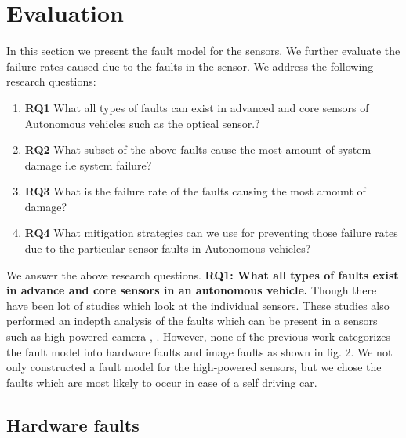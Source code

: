 \section{Evaluation}
In this section we present the fault model for the sensors. We further evaluate the failure rates caused due to the faults in the sensor. We address the following research questions:
\begin{enumerate}
	\item \textbf{RQ1}
	What all types of faults can exist in advanced and core sensors of Autonomous vehicles such as the optical sensor.?
	\item \textbf{RQ2}
	What subset of the above faults cause the most amount of system damage i.e system failure?
	\item \textbf{RQ3}
	What is the failure rate of the faults causing the most amount of damage?
	\item \textbf{RQ4}
	What mitigation strategies can we use for preventing those failure rates due to the particular sensor faults in Autonomous vehicles?
\end{enumerate}
\vskip 0.2in
We answer the above research questions. 
\vskip 0.2in
\textbf{RQ1: What all types of faults exist in advance and core sensors in an autonomous vehicle.}
Though there have been lot of studies which look at the individual sensors. These studies also performed an indepth analysis of the faults which can be present in a sensors such as high-powered camera \cite{5530865}, \cite{inproceedings}. However, none of the previous work categorizes the fault model into hardware faults and image faults as shown in fig. 2. We not only constructed a fault model for the high-powered sensors, but we chose the faults which are most likely to occur in case of a self driving car. 

\subsection{Hardware faults}